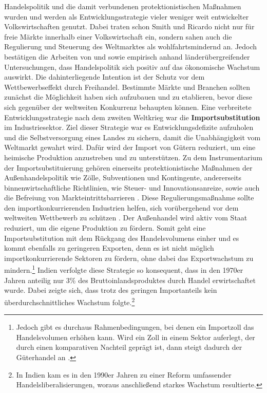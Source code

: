 Handelspolitik und die damit verbundenen protektionistischen Ma{\ss}nahmen wurden und werden als Entwicklungsstrategie vieler weniger weit entwickelter Volkswirtschaften genutzt. Dabei traten schon Smith und Ricardo nicht nur f{\"u}r freie M{\"a}rkte innerhalb einer Volkswirtschaft ein, sondern sahen auch die Regulierung und Steuerung des Weltmarktes als wohlfahrtsmindernd an. Jedoch best{\"a}tigen die Arbeiten von \citet{Dollar.1992,BenDavid.1993,Sachs.1995,Frankel.1999} und \citet{Edwards.1993} sowie \citet{RodriguezCaballero.2000} empirisch anhand l{\"a}nder{\"u}bergreifender Untersuchungen, dass Handelspolitik sich positiv auf das {\"o}konomische Wachstum auswirkt. Die dahinterliegende Intention ist der Schutz vor dem Wettbewerbseffekt durch Freihandel. Bestimmte M{\"a}rkte und Branchen sollten zun{\"a}chst die M{\"o}glichkeit haben sich aufzubauen und zu etablieren, bevor diese sich gegen{\"u}ber der weltweiten Konkurrenz behaupten k{\"o}nnen. \newline
Eine verbreitete Entwicklungsstrategie nach dem zweiten Weltkrieg war die \textbf{Importsubstitution} im Industriesektor. Ziel dieser Strategie war es Entwicklungsdefizite aufzuholen und die Selbstversorgung eines Landes zu sichern, damit die Unabh{\"a}ngigkeit vom Weltmarkt gewahrt wird. Daf{\"u}r wird der Import von G{\"u}tern reduziert, um eine heimische Produktion anzustreben und zu unterst{\"u}tzen. Zu dem Instrumentarium der Importsubstituierung geh{\"o}ren einerseits protektionistische Ma{\ss}nahmen der Au{\ss}enhandelspolitik wie Z{\"o}lle, Subventionen und Kontingente, andererseits binnenwirtschaftliche Richtlinien, wie Steuer- und Innovationsanreize, sowie auch die Befreiung von Markteintrittsbarrieren \citep{Muller.2005,Lachmann.1994}. Diese Regulierungsma{\ss}nahme sollte den importkonkurrierenden Industrien helfen, sich vor{\"u}bergehend vor dem weltweiten Wettbewerb zu sch{\"u}tzen \cite{Lewis.1955}. Der Au{\ss}enhandel wird aktiv vom Staat reduziert, um die eigene Produktion zu f{\"o}rdern. Somit geht eine Importsubstitution mit dem R{\"u}ckgang des Handelsvolumens einher und es kommt ebenfalls zu geringeren Exporten, denn es ist nicht m{\"o}glich importkonkurrierende Sektoren zu f{\"o}rdern, ohne dabei das Exportwachstum zu mindern.\footnote{Jedoch gibt es durchaus Rahmenbedingungen, bei denen ein Importzoll das Handelsvolumen erh{\"o}hen kann. Wird ein Zoll in einem Sektor auferlegt, der durch einen komparativen Nachteil gepr{\"a}gt ist, dann steigt dadurch der G{\"u}terhandel an \cite{Lancaster.1980}.} 
Indien verfolgte diese Strategie so konsequent, dass in den 1970er Jahren anteilig nur 3{\%} des Bruttoinlandsproduktes durch Handel erwirtschaftet wurde. Dabei zeigte sich, dass trotz des geringen Importanteils kein {\"u}berdurchschnittliches Wachstum folgte.\footnote{In Indien kam es in den 1990er Jahren zu einer Reform umfassender Handelsliberalisierungen, woraus anschlie{\ss}end starkes Wachstum resultierte.}
